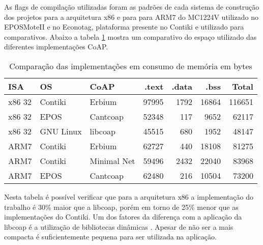 As flags de compila\c{c}\~ao utilizadas foram as padr\~oes de cada sistema de constru\c{c}\~ao dos projetos para a arquitetura x86 e para para ARM7 do MC1224V utilizado no EPOSMoteII e no Econotag, plataforma presente no Contiki e utilizado para comparativos. Abaixo a tabela \ref{comparacaoCoap} mostra um comparativo do espa\c{c}o utilizado das diferentes implementa\c{c}\~oes CoAP.

\begin{table}[H]
\centering
\begin{tabular}{@{}p{1cm}p{1cm}p{1cm}r{1cm}r{1cm}r{1cm}r{1cm}@{}}
    \toprule
    ISA & OS & CoAP & .text & .data & .bss & Total\\ \midrule
    x86 32& Contiki & Erbium & 97995 & 1792 & 16864 & 116651 \\
    x86 32& EPOS & Cantcoap & 52348 & 117 & 9652 & 62117 \\
    x86 32& GNU Linux & libcoap & 45515 & 680 & 1952 & 48147\\ \hline
    ARM7 & Contiki & Erbium & 62727 & 440 & 18108 & 81275\\
    ARM7 & Contiki & Minimal Net & 59496 & 2432 & 22040 & 83968\\
    ARM7 & EPOS & Cantcoap & 62480 & 216 & 10504 & 73200\\
    \bottomrule
\end{tabular}
\caption{Compara\c{c}\~ao das implementa\c{c}\~oes em consumo de mem\'oria em bytes}
\label{comparacaoCoap}
\end{table}

Nesta tabela \'e poss\'ivel verificar que para a arquitetura x86 a implementa\c{c}\~ao do trabalho \'e 30\% maior que a libcoap, por\'em em torno de 25\% menor que as implementa\c{c}\~oes do Contiki. Um dos fatores da diferen\c{c}a com a aplica\c{c}\~ao da libcoap \'e a utiliza\c{c}\~ao de bibliotecas din\^amicas \cite{ibmCodeSize}. Apesar de n\~ao ser a mais compacta \'e suficientemente pequena para ser utilizada na aplica\c{c}\~ao.


